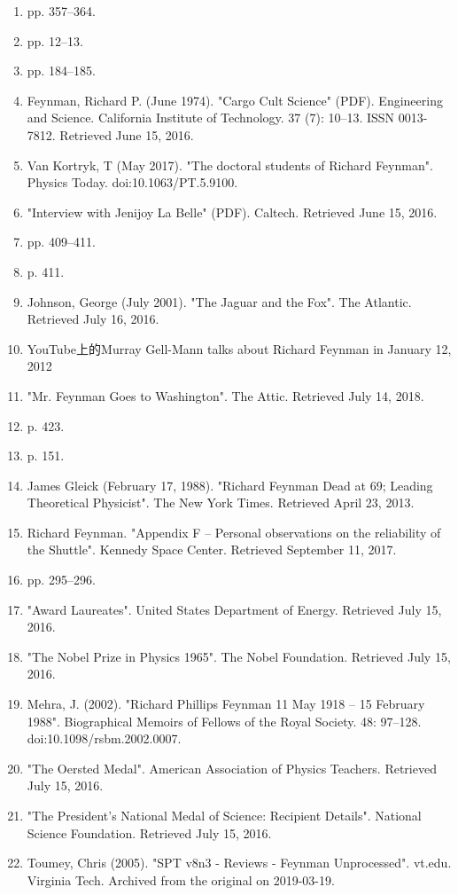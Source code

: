 \begin{enumerate}
\item  pp. 357–364.
\item  pp. 12–13.
\item  pp. 184–185.
\item Feynman, Richard P. (June 1974). "Cargo Cult Science" (PDF). Engineering and Science. California Institute of Technology. 37 (7): 10–13. ISSN 0013-7812. Retrieved June 15, 2016.
\item Van Kortryk, T (May 2017). "The doctoral students of Richard Feynman". Physics Today. doi:10.1063/PT.5.9100.
\item "Interview with Jenijoy La Belle" (PDF). Caltech. Retrieved June 15, 2016.
\item  pp. 409–411.
\item  p. 411.
\item Johnson, George (July 2001). "The Jaguar and the Fox". The Atlantic. Retrieved July 16, 2016.
\item YouTube上的Murray Gell-Mann talks about Richard Feynman in January 12, 2012
\item "Mr. Feynman Goes to Washington". The Attic. Retrieved July 14, 2018.
\item  p. 423.
\item  p. 151.
\item James Gleick (February 17, 1988). "Richard Feynman Dead at 69; Leading Theoretical Physicist". The New York Times. Retrieved April 23, 2013.
\item Richard Feynman. "Appendix F – Personal observations on the reliability of the Shuttle". Kennedy Space Center. Retrieved September 11, 2017.
\item  pp. 295–296.
\item "Award Laureates". United States Department of Energy. Retrieved July 15, 2016.
\item "The Nobel Prize in Physics 1965". The Nobel Foundation. Retrieved July 15, 2016.
\item Mehra, J. (2002). "Richard Phillips Feynman 11 May 1918 – 15 February 1988". Biographical Memoirs of Fellows of the Royal Society. 48: 97–128. doi:10.1098/rsbm.2002.0007.
\item "The Oersted Medal". American Association of Physics Teachers. Retrieved July 15, 2016.
\item "The President's National Medal of Science: Recipient Details". National Science Foundation. Retrieved July 15, 2016.
\item Toumey, Chris (2005). "SPT v8n3 - Reviews - Feynman Unprocessed". vt.edu. Virginia Tech. Archived from the original on 2019-03-19.

\end{enumerate}
